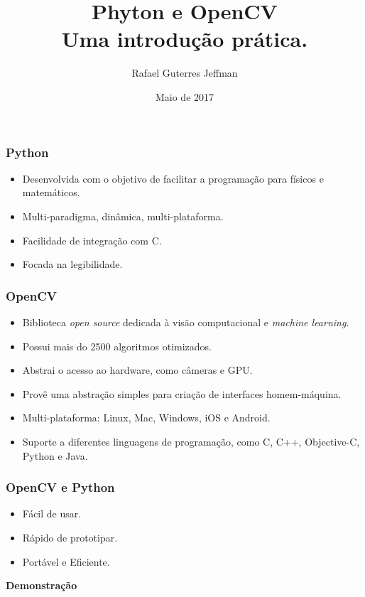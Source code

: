 \documentclass[aspectratio=169,14pt]{beamer}
\title[]{\color{black} \textbf{Phyton e OpenCV \\ Uma introdução prática.}}
\author[]{Rafael Guterres Jeffman}
\institute[]{Faculdade Senac Porto Alegre \\ Tchelinux}
\date{Maio de 2017}
\begin{document}
\begin{frame}
    \titlepage
\end{frame}


\begin{frame}
    \frametitle{Python}
    \begin{itemize}
        \item{Desenvolvida com o objetivo de facilitar a programação para
        físicos e matemáticos.}
        \item{Multi-paradigma, dinâmica, multi-plataforma.}
        \item{Facilidade de integração com C.}
        \item{Focada na legibilidade.}
    \end{itemize}
\end{frame}

\begin{frame}
    \frametitle{OpenCV}
    \begin{itemize}
        \item{Biblioteca \emph{open source} dedicada à visão computacional
        e \emph{machine learning}.}
        \item{Possui mais do 2500 algoritmos otimizados.}
        \item{Abstrai o acesso ao hardware, como câmeras e GPU.}
        \item{Provê uma abstração simples para criação de interfaces
        homem-máquina.}
        \item{Multi-plataforma: Linux, Mac, Windows, iOS e Android.}
        \item{Suporte a diferentes linguagens de programação, como
        C, C++, Objective-C, Python e Java.}
    \end{itemize}
\end{frame}

\begin{frame}
    \frametitle{OpenCV e Python}
    \begin{itemize}
        \item{Fácil de usar.}
        \item{Rápido de prototipar.}
        \item{Portável e Eficiente.}
    \end{itemize}
\end{frame}

\begin{frame}[c]
    \begin{center}
    \Huge \textbf{Demonstração}
    \end{center}
\end{frame}
\end{document}
